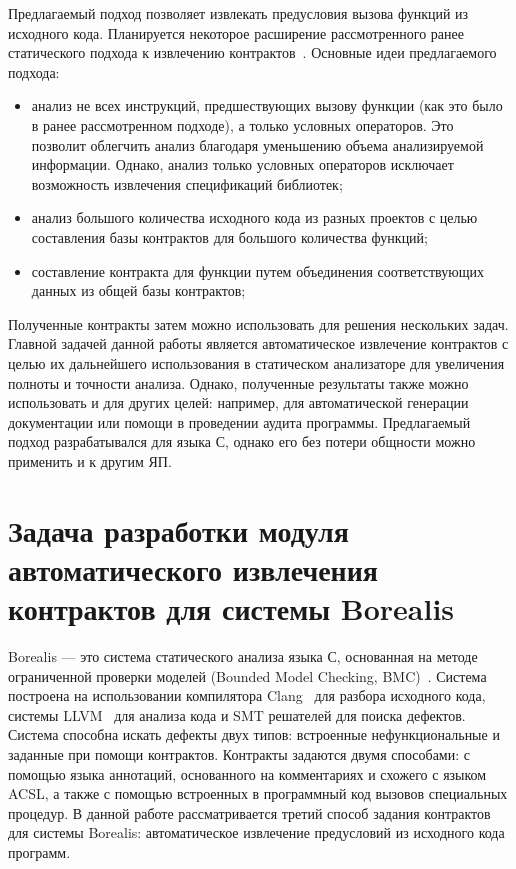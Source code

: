 Предлагаемый подход позволяет извлекать предусловия вызова функций из исходного кода. Планируется некоторое расширение рассмотренного ранее статического подхода к извлечению контрактов~\cite{staticPredicateMining}. Основные идеи предлагаемого подхода:
\begin{itemize}
\item анализ не всех инструкций, предшествующих вызову функции (как это было в ранее рассмотренном подходе), а только условных операторов. Это позволит облегчить анализ благодаря уменьшению объема анализируемой информации. Однако, анализ только условных операторов исключает возможность извлечения спецификаций библиотек;
\item анализ большого количества исходного кода из разных проектов с целью составления базы контрактов для большого количества функций;
\item составление контракта для функции путем объединения соответствующих данных из общей базы контрактов;
\end{itemize}

Полученные контракты затем можно использовать для решения нескольких задач. Главной задачей данной работы является автоматическое извлечение контрактов с целью их дальнейшего использования в статическом анализаторе для увеличения полноты и точности анализа. Однако, полученные результаты также можно использовать и для других целей: например, для автоматической генерации документации или помощи в проведении аудита программы. Предлагаемый подход разрабатывался для языка С, однако его без потери общности можно применить и к другим ЯП.

\section{Задача разработки модуля автоматического извлечения контрактов для системы Borealis}
Borealis --- это система статического анализа языка С, основанная на методе ограниченной проверки моделей (Bounded Model Checking, BMC)~\cite{bmc}. Система построена на использовании компилятора Clang~\cite{clang} для разбора исходного кода, системы LLVM~\cite{llvm} для анализа кода и SMT решателей для поиска дефектов. Система способна искать дефекты двух типов: встроенные нефункциональные и заданные при помощи контрактов. Контракты задаются двумя способами: с помощью языка аннотаций, основанного на комментариях и схожего с языком ACSL, а также с помощью встроенных в программный код вызовов специальных процедур. В данной работе рассматривается третий способ задания контрактов для системы Borealis: автоматическое извлечение предусловий из исходного кода программ.

